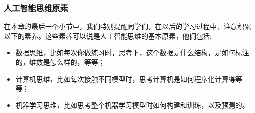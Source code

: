 \documentclass[12pt]{article}
\numberwithin{figure}{section}
\numberwithin{equation}{section}
\begin{document}
\subsubsection{人工智能思维原素}

在本章的最后一个小节中，我们特别提醒同学们，在以后的学习过程中，注意积累以下的素养。这些素养可以说是人工智能思维的基本原素，他们包括:
\begin{itemize}
	\item 数据思维，比如每次你做练习时，思考下，这个数据是什么结构，是如何标注的，维数是怎么样的，等等；
	\item 计算机思维，比如每次接触不同模型时，思考计算机是如何程序化计算得等等；
	\item 机器学习思维，比如思考整个机器学习模型时如何构建和训练，以及预测的。
\end{itemize}
\end{document}
